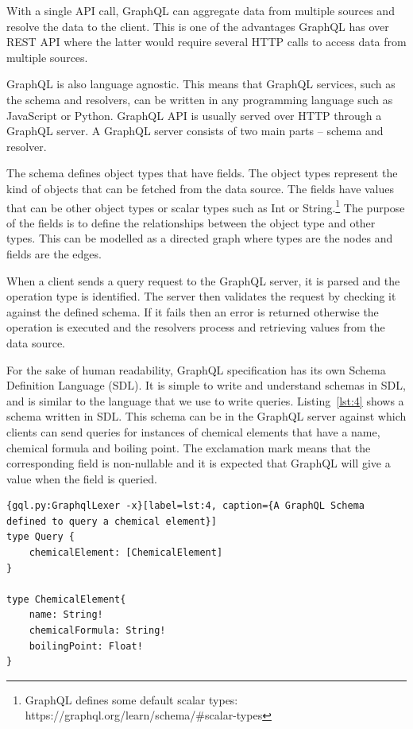 With a single API call, GraphQL can aggregate data from multiple sources and resolve the data to the client. This is one of the advantages GraphQL has over REST API where the latter would require several HTTP calls to access data from multiple sources. 

GraphQL is also language agnostic. This means that GraphQL services, such as the schema and resolvers, can be written in any programming language such as JavaScript or Python. GraphQL API is usually served over HTTP through a GraphQL server. A GraphQL server consists of two main parts – schema and resolver. 

The schema defines object types that have fields. The object types represent the kind of objects that can be fetched from the data source. The fields have values that can be other object types or scalar types such as Int or String.\footnote{GraphQL defines some default scalar types: https://graphql.org/learn/schema/\#scalar-types} The purpose of the fields is to define the relationships between the object type and other types. This can be modelled as a directed graph where types are the nodes and fields are the edges. 

When a client sends a query request to the GraphQL server, it is parsed and the operation type is identified. The server then validates the request by checking it against the defined schema. If it fails then an error is returned otherwise the operation is executed and the resolvers process and retrieving values from the data source.

For the sake of human readability, GraphQL specification has its own Schema Definition Language (SDL). It is simple to write and understand schemas in SDL, and is similar to the language that we use to write queries. Listing~\ref{lst:4} shows a schema written in SDL. This schema can be in the GraphQL server against which clients can send queries for instances of chemical elements that have a name, chemical formula and boiling point. The exclamation mark means that the corresponding field is non-nullable and it is expected that GraphQL will give a value when the field is queried.

\begin{minipage}{\linewidth}
\begin{lstlisting}{gql.py:GraphqlLexer -x}[label=lst:4, caption={A GraphQL Schema defined to query a chemical element}]
type Query {
	chemicalElement: [ChemicalElement]
}

type ChemicalElement{
	name: String!
	chemicalFormula: String!
	boilingPoint: Float!
}
\end{lstlisting}
\end{minipage}

